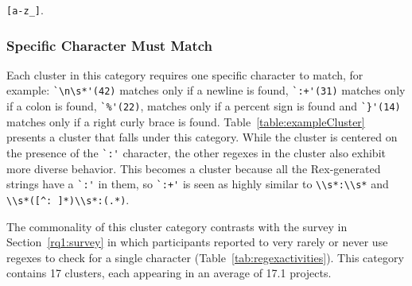 \verb![a-z_]!.


\subsubsection{Specific Character Must Match}
\label{cluster:single}
Each cluster in this category requires one specific character to match, for example:
\verb!`\n\s*'(42)! matches only if a newline is found, \verb!`:+'(31)! matches only if a colon is found, \verb!`%'(22)!, matches only if a percent sign is found and \verb!`}'(14)! matches only if a right curly brace is found.
Table~\ref{table:exampleCluster} presents a cluster that falls under this category. While the cluster is centered on the presence of the \verb!`:'! character, the other regexes in the cluster also exhibit more diverse behavior. This becomes a cluster because all the Rex-generated strings have a \verb!`:'! in them, so \verb!`:+'! is seen as highly similar to \verb!\\s*:\\s*! and \verb!\\s*([^: ]*)\\s*:(.*)!. 
 
The commonality of this cluster category contrasts with the survey in Section~\ref{rq1:survey} in which participants reported to very rarely or never use regexes to check for a single character (Table~\ref{tab:regexactivities}).
This category contains 17 clusters, each appearing in an average of 17.1 projects. 

